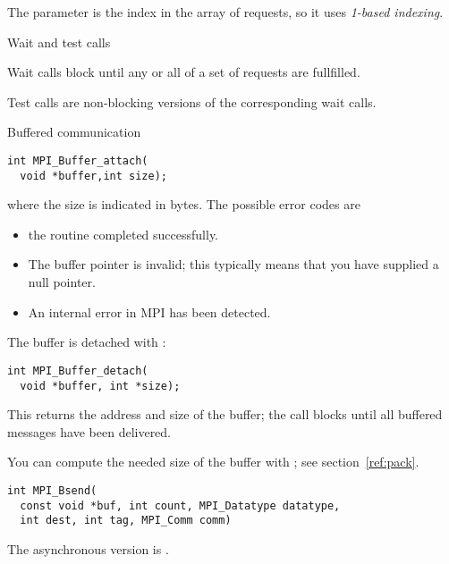 \begin{fortrannote}
  The  parameter is the index in the array of requests,
  so it uses \emph{1-based indexing}.
\end{fortrannote}

 {Wait and test calls}

Wait calls block until any or all of a set of requests are fullfilled.


Test calls are non-blocking versions of the corresponding wait calls.


 {Buffered communication}

\begin{verbatim}
int MPI_Buffer_attach(
  void *buffer,int size);
\end{verbatim}
where the size is indicated in bytes.
The possible error codes are
\begin{itemize}
\item {} the routine completed successfully.
\item {} The buffer pointer is invalid;
  this typically means that you have supplied a null pointer.
\item {} An internal error in MPI has been detected.
\end{itemize}

The buffer is detached with :
\begin{verbatim}
int MPI_Buffer_detach(
  void *buffer, int *size);
\end{verbatim}
This returns the address and size of the buffer; the call blocks
until all buffered messages have been delivered.

You can compute the needed size of the buffer with ;
  see section~\ref{ref:pack}.

\begin{verbatim}
int MPI_Bsend(
  const void *buf, int count, MPI_Datatype datatype, 
  int dest, int tag, MPI_Comm comm)
\end{verbatim}
The asynchronous version is .

